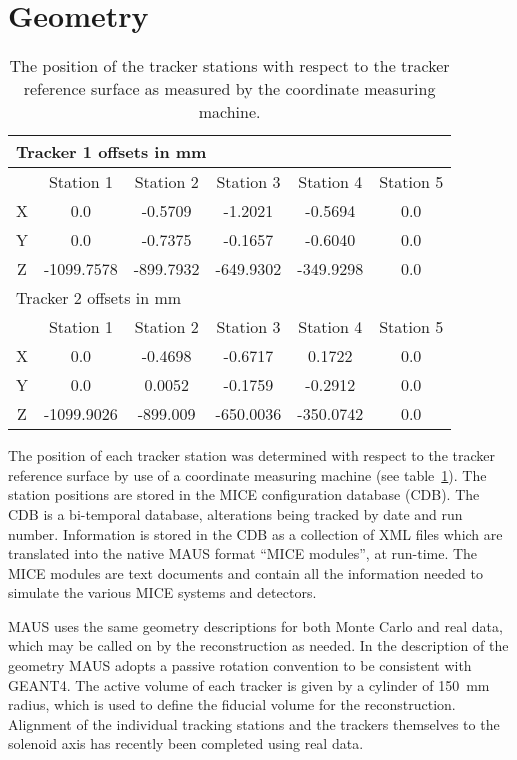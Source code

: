 \section{Geometry}
\label{sec:Geometry}
  
  \begin{table} [tbp]
  \begin{center}
  \begin{tabular} {|c|c|c|c|c|c|}
    \hline
    \multicolumn{6}{|l|}{Tracker 1 offsets in mm} \\
    \hline
    & Station 1 & Station 2 & Station 3 & Station 4 & Station 5 \\
    \hline
    X & 0.0 & -0.5709 & -1.2021 & -0.5694 & 0.0 \\
    Y & 0.0 & -0.7375 & -0.1657 & -0.6040 & 0.0 \\
    Z & -1099.7578 & -899.7932 & -649.9302 & -349.9298 & 0.0 \\
    \hline
    \hline
    \multicolumn{6}{|l|}{Tracker 2 offsets in mm} \\
    \hline
    & Station 1 & Station 2 & Station 3 & Station 4 & Station 5 \\
    \hline
    X & 0.0 & -0.4698 & -0.6717 & 0.1722 & 0.0 \\
    Y & 0.0 & 0.0052 & -0.1759 & -0.2912 & 0.0 \\
    Z & -1099.9026 & -899.009 & -650.0036 & -350.0742 & 0.0 \\
    \hline
  \end{tabular}
  \caption{\label{tab:CMM} The position of the tracker stations with respect to the tracker reference surface as measured by the coordinate measuring machine.}
  \end{center}
  \end{table}
  
  The position of each tracker station was determined with respect to the tracker reference surface by use of a coordinate measuring machine (see table~\ref{tab:CMM}). The station positions are stored in the MICE configuration database (CDB). The CDB is a bi-temporal database, alterations being tracked by date and run number. Information is stored in the CDB as a collection of XML files which are translated into the native MAUS format ``MICE modules'', at run-time.  The MICE modules are text documents and contain all the information needed to simulate the various MICE systems and detectors.
  
  MAUS uses the same geometry descriptions for both Monte Carlo and real data, which may be called on by the reconstruction as needed. In the description of the geometry MAUS adopts a passive rotation convention to be consistent with GEANT4.  The active volume of each tracker is given by a cylinder of 150~mm radius, which is used to define the fiducial volume for the reconstruction. Alignment of the individual tracking stations and the trackers themselves to the solenoid axis has recently been completed using real data.
  
